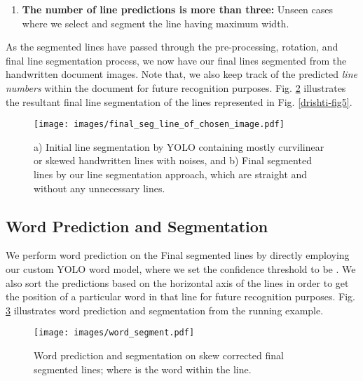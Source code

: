 \documentclass[runningheads]{llncs}
\begin{document}
\begin{enumerate}
  \begin{figure}[h]
  \vspace{-4mm}
    \centering    
    \texttt{[image: images/selection\_2nd\_line\_3.pdf]}
    \vspace{-4mm}
    \caption{Line image with two line prediction and segmentation.} 
    \label{drishti-fig11}
    \vspace{-4mm}
  \end{figure}

  \item \textbf{The number of line predictions is more than three:} Unseen cases where we select and segment the line having maximum width.
\end{enumerate}

\noindent As the segmented lines have passed through the pre-processing, rotation, and final line segmentation process, we now have our final lines segmented from the handwritten document images. Note that, we also keep track of the predicted \textit{line numbers} within the document for future recognition purposes. Fig. \ref{drishti-fig12} illustrates the resultant final line segmentation of the lines represented in Fig. \ref{drishti-fig5}.

 \begin{figure}[!h]
    \vspace{-4mm}
    \centering
\texttt{[image: images/final\_seg\_line\_of\_chosen\_image.pdf]}
    \vspace{-6mm}
    \caption{a) Initial line segmentation by YOLO containing mostly curvilinear or skewed handwritten lines with noises, and b) Final segmented lines by our line segmentation approach, which are straight and without any unnecessary lines.} 
    \label{drishti-fig12}
\end{figure}


\subsection{Word Prediction and Segmentation}
\label{sec_4_5}
We perform word prediction on the Final segmented lines by directly employing our custom YOLO word model, where we set the confidence threshold to be . We also sort the predictions based on the horizontal axis of the lines in order to get the position of a particular word in that line for future recognition purposes. Fig. \ref{drishti-fig13} illustrates word prediction and segmentation from the running example.

\begin{figure}
    \vspace{-4mm}
    \centering
    \texttt{[image: images/word\_segment.pdf]}
    \vspace{-6mm}
    \caption{Word prediction and segmentation on skew corrected final segmented lines; where \textbf{} is the  word within the line.} 
    \label{drishti-fig13}
    \vspace{-10mm}
\end{figure}
\end{document}
